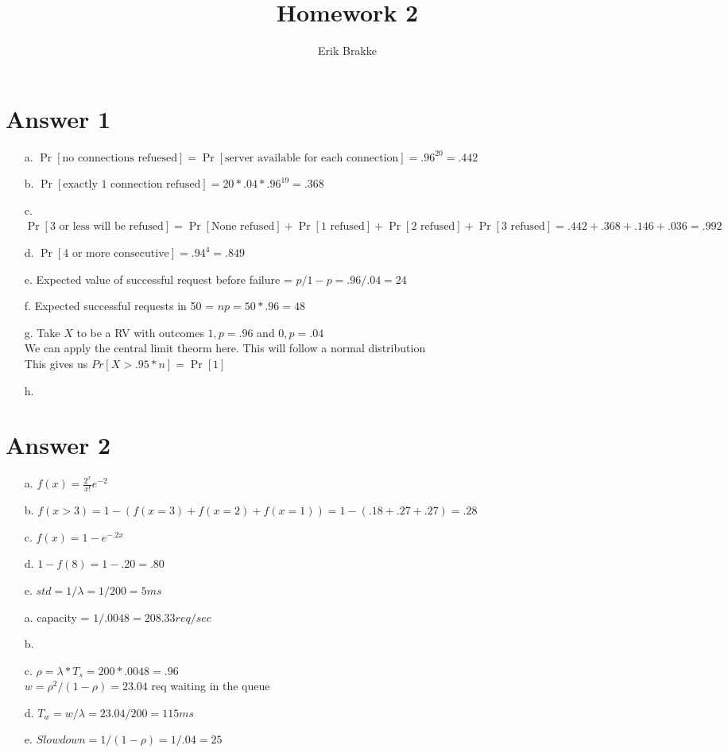 \documentclass[11pt]{article}
\theoremstyle{definition}
\begin{document}
\title{Homework 2}
\author{Erik Brakke}
\maketitle

\thispagestyle{fancy}
 
 
\section*{Answer 1}
\begin{enumerate}
	\item[a.] $\Pr[\text{no connections refuesed}] = \Pr[\text{server available for each connection}] = .96^{20} = .442$
	\item[b.] $\Pr[\text{exactly 1 connection refused}] = 20 * .04 * .96^{19} = .368$
	\item[c.] $\Pr[\text{3 or less will be refused}] = \Pr[\text{None refused}] + \Pr[\text{1 refused}] + \Pr[\text{2 refused}] + \Pr[\text{3 refused}] = .442 + .368 + .146 + .036 = .992$
	\item[d.] $\Pr[\text{4 or more consecutive}] = .94 ^ 4 = .849$
	\item[e.] Expected value of successful request before failure = $p / 1-p = .96 / .04 = 24$
	\item[f.] Expected successful requests in 50 = $np = 50 * .96 = 48$
	\item[g.] Take $X$ to be a RV with outcomes $1, p = .96$ and $0, p = .04$\\
	We can apply the central limit theorm here.  This will follow a normal distribution\\
	This gives us $Pr[X > .95*n] = \Pr[1]$
	\item[h.] 
\end{enumerate}

\section*{Answer 2}
\begin{enumerate}
	\item[a.] $f(x) = \frac{2^x}{x!}e^{-2}$
	\item[b.] $f(x > 3) = 1 - (f(x = 3) + f(x=2) + f(x=1)) = 1 - (.18 + .27 + .27) = .28$
	\item[c.] $f(x) = 1 - e^{-.2x}$
	\item[d.] $1 - f(8) = 1 - .20 = .80$
	\item[e.] $std = 1/\lambda = 1 / 200 = 5 ms$
	\newline
	\item[a.] capacity = $1 / .0048 = 208.33 req/sec$
	\item[b.] 
	\item[c.] $\rho = \lambda * T_s = 200 * .0048 = .96$\\
	$w = \rho^2/(1-\rho) = 23.04$ req waiting in the queue
	\item[d.] $T_w = w/\lambda = 23.04 / 200 = 115ms$
	\item[e.] $Slowdown = 1/(1-\rho) = 1/.04 = 25$ 
\end{enumerate}
\end{document}
